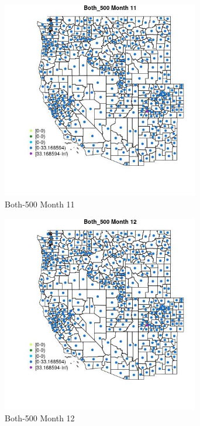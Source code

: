 \begin{figure} 
\centering  
\includegraphics[width=0.77\textwidth]{Code_Outputs/df_report_ML_predictors_CountyCentroid_Locations_Dates_2008-01-01to2018-12-31_MapObsMo11Both_500.jpg} 
\caption{\label{fig:df_report_ML_predictors_CountyCentroid_Locations_Dates_2008-01-01to2018-12-31MapObsMo11Both_500}Both-500 Month 11} 
\end{figure} 
 

\begin{figure} 
\centering  
\includegraphics[width=0.77\textwidth]{Code_Outputs/df_report_ML_predictors_CountyCentroid_Locations_Dates_2008-01-01to2018-12-31_MapObsMo12Both_500.jpg} 
\caption{\label{fig:df_report_ML_predictors_CountyCentroid_Locations_Dates_2008-01-01to2018-12-31MapObsMo12Both_500}Both-500 Month 12} 
\end{figure} 
 


